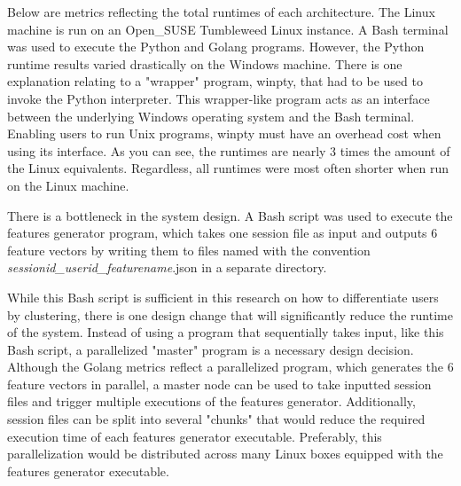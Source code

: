 Below are metrics reflecting the total runtimes of each architecture. The Linux machine is run on an Open{\_}SUSE Tumbleweed Linux instance. A Bash terminal was used to execute the Python and Golang programs. However, the Python runtime results varied drastically on the Windows machine. There is one explanation relating to a "wrapper" program, winpty, that had to be used to invoke the Python interpreter. This wrapper-like program acts as an interface between the underlying Windows operating system and the Bash terminal. Enabling users to run Unix programs, winpty must have an overhead cost when using its interface. As you can see, the runtimes are nearly 3 times the amount of the Linux equivalents. Regardless, all runtimes were most often shorter when run on the Linux machine.

There is a bottleneck in the system design. A Bash script was used to execute the features generator program, which takes one session file as input and outputs 6 feature vectors by writing them to files named with the convention \textit{sessionid{\_}userid{\_}featurename}.json in a separate directory.

While this Bash script is sufficient in this research on how to differentiate users by clustering, there is one design change that will significantly reduce the runtime of the system. Instead of using a program that sequentially takes input, like this Bash script, a parallelized "master" program is a necessary design decision. Although the Golang metrics reflect a parallelized program, which generates the 6 feature vectors in parallel, a master node can be used to take inputted session files and trigger multiple executions of the features generator. Additionally, session files can be split into several "chunks" that would reduce the required execution time of each features generator executable. Preferably, this parallelization would be distributed across many Linux boxes equipped with the features generator executable.

